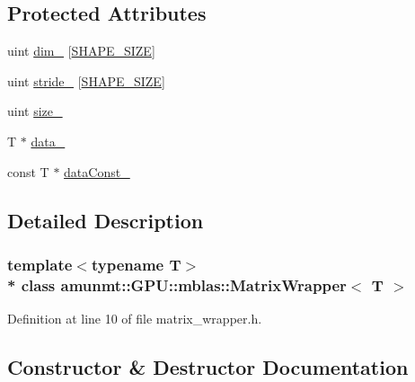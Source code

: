 \subsection*{Protected Attributes}
\begin{DoxyCompactItemize}
\item 
uint \hyperlink{classamunmt_1_1GPU_1_1mblas_1_1MatrixWrapper_a3a215de9912888c405dbce53470c00cf}{dim\+\_\+} \mbox{[}\hyperlink{namespaceamunmt_a0c4d3d7c0b1b52dbe7a658b3dc026409}{S\+H\+A\+P\+E\+\_\+\+S\+I\+ZE}\mbox{]}
\item 
uint \hyperlink{classamunmt_1_1GPU_1_1mblas_1_1MatrixWrapper_a6dabb13853d38e442864ffa313367758}{stride\+\_\+} \mbox{[}\hyperlink{namespaceamunmt_a0c4d3d7c0b1b52dbe7a658b3dc026409}{S\+H\+A\+P\+E\+\_\+\+S\+I\+ZE}\mbox{]}
\item 
uint \hyperlink{classamunmt_1_1GPU_1_1mblas_1_1MatrixWrapper_a0129d0e6411ab44f357899527a9de65d}{size\+\_\+}
\item 
T $\ast$ \hyperlink{classamunmt_1_1GPU_1_1mblas_1_1MatrixWrapper_ab350c962dc0fc97fcdb2b1e10b0474e9}{data\+\_\+}
\item 
const T $\ast$ \hyperlink{classamunmt_1_1GPU_1_1mblas_1_1MatrixWrapper_a2b562e025bf15e9df43c2db85b4e9ee2}{data\+Const\+\_\+}
\end{DoxyCompactItemize}


\subsection{Detailed Description}
\subsubsection*{template$<$typename T$>$\\*
class amunmt\+::\+G\+P\+U\+::mblas\+::\+Matrix\+Wrapper$<$ T $>$}



Definition at line 10 of file matrix\+\_\+wrapper.\+h.



\subsection{Constructor \& Destructor Documentation}

